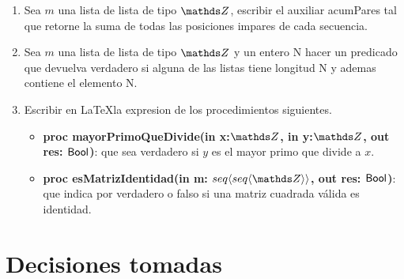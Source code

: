 \documentclass[a4paper]{article}
\begin{document}
\begin{enumerate}


\item Sea $m$ una lista de lista de tipo $\ent$, escribir el auxiliar acumPares tal que retorne la suma de todas las posiciones impares de cada secuencia.

\item Sea $m$ una lista de lista de tipo $\ent$ y un entero N hacer un predicado que devuelva verdadero si alguna de las listas tiene longitud N y ademas contiene el elemento N.


\item Escribir en \LaTeX  la expresion de los procedimientos siguientes.

\begin{itemize}
\item  \textbf{proc mayorPrimoQueDivide(in x:$\ent$, in y:$\ent$, out res: $\mathsf{Bool}$)}: que sea verdadero si $y$ es el mayor primo que divide a $x$.

\item \textbf{proc esMatrizIdentidad(in m: $\TLista{\TLista{\ent}}$, out res: $\mathsf{Bool}$)}: que indica por verdadero o falso si una matriz cuadrada v\'alida es identidad.

\end{itemize}
\end{enumerate}




\section{Decisiones tomadas}
\end{document}
